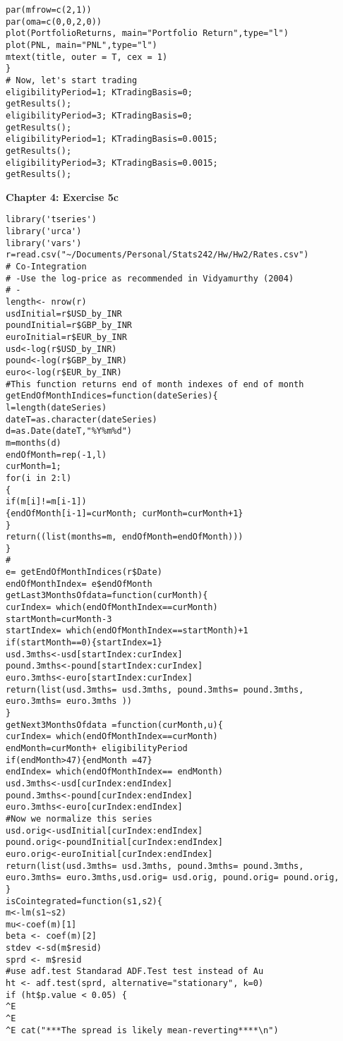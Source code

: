 \begin{small}
\begin{lstlisting}
par(mfrow=c(2,1))
par(oma=c(0,0,2,0))
plot(PortfolioReturns, main="Portfolio Return",type="l")
plot(PNL, main="PNL",type="l")
mtext(title, outer = T, cex = 1)
}
# Now, let's start trading
eligibilityPeriod=1; KTradingBasis=0;
getResults();
eligibilityPeriod=3; KTradingBasis=0;
getResults();
eligibilityPeriod=1; KTradingBasis=0.0015;
getResults();
eligibilityPeriod=3; KTradingBasis=0.0015;
getResults();
\end{lstlisting}
\textbf{Chapter 4: Exercise 5c}
\begin{lstlisting}
library('tseries')
library('urca')
library('vars')
r=read.csv("~/Documents/Personal/Stats242/Hw/Hw2/Rates.csv")
# Co-Integration
# -Use the log-price as recommended in Vidyamurthy (2004)
# -
length<- nrow(r)
usdInitial=r$USD_by_INR
poundInitial=r$GBP_by_INR
euroInitial=r$EUR_by_INR
usd<-log(r$USD_by_INR)
pound<-log(r$GBP_by_INR)
euro<-log(r$EUR_by_INR)
#This function returns end of month indexes of end of month
getEndOfMonthIndices=function(dateSeries){
l=length(dateSeries)
dateT=as.character(dateSeries)
d=as.Date(dateT,"%Y%m%d")
m=months(d)
endOfMonth=rep(-1,l)
curMonth=1;
for(i in 2:l)
{
if(m[i]!=m[i-1])
{endOfMonth[i-1]=curMonth; curMonth=curMonth+1}
}
return((list(months=m, endOfMonth=endOfMonth)))
}
#
e= getEndOfMonthIndices(r$Date)
endOfMonthIndex= e$endOfMonth
getLast3MonthsOfdata=function(curMonth){
curIndex= which(endOfMonthIndex==curMonth)
startMonth=curMonth-3
startIndex= which(endOfMonthIndex==startMonth)+1
if(startMonth==0){startIndex=1}
usd.3mths<-usd[startIndex:curIndex]
pound.3mths<-pound[startIndex:curIndex]
euro.3mths<-euro[startIndex:curIndex]
return(list(usd.3mths= usd.3mths, pound.3mths= pound.3mths, euro.3mths= euro.3mths ))
}
getNext3MonthsOfdata =function(curMonth,u){
curIndex= which(endOfMonthIndex==curMonth)
endMonth=curMonth+ eligibilityPeriod
if(endMonth>47){endMonth =47}
endIndex= which(endOfMonthIndex== endMonth)
usd.3mths<-usd[curIndex:endIndex]
pound.3mths<-pound[curIndex:endIndex]
euro.3mths<-euro[curIndex:endIndex]
#Now we normalize this series
usd.orig<-usdInitial[curIndex:endIndex]
pound.orig<-poundInitial[curIndex:endIndex]
euro.orig<-euroInitial[curIndex:endIndex]
return(list(usd.3mths= usd.3mths, pound.3mths= pound.3mths, euro.3mths= euro.3mths,usd.orig= usd.orig, pound.orig= pound.orig,
}
isCointegrated=function(s1,s2){
m<-lm(s1~s2)
mu<-coef(m)[1]
beta <- coef(m)[2]
stdev <-sd(m$resid)
sprd <- m$resid
#use adf.test Standarad ADF.Test test instead of Au
ht <- adf.test(sprd, alternative="stationary", k=0)
if (ht$p.value < 0.05) {
^E
^E
^E cat("***The spread is likely mean-reverting****\n")

\end{lstlisting}
\end{small}

